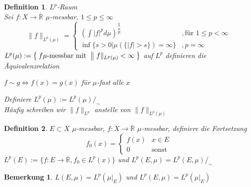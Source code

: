 \documentclass[11pt]{memoir}
\theoremstyle{changebreak}
\newtheorem{Definition}{Definition}[chapter]
\newtheorem{Bemerkung}{Bemerkung}[chapter]
\begin{document}

\begin{Definition}
\emph{$L^p$-Raum} \\
Sei $f: X \rightarrow \overline{\mathbb R}$ $\mu$-messbar, $1 \leq p \leq \infty$ \\
\begin{equation}
\|f\|_{L^p (\mu)} =
\begin{cases}
	\left( \int |f|^p d\mu\right) ^{\dfrac{1}{p}} & , \text{für } 1 \leq p < \infty \\
	\inf \{s > 0 | \mu(\{|f| > s\}) = \infty \} & , p = \infty
\end{cases}
\end{equation}
$L^p(\mu):= \Set{f \mu\text{-messbar mit }\|f\|_{L^p (\mu)} < \infty}$ auf $L^p$ definieren die Äquivalenzrelation
\begin{center}
	$f \sim g \Leftrightarrow f(x) = g(x)$ für $\mu$-fast alle $x$
\end{center}
Definiere $L^p(\mu) := L^p(\mu) /_\sim$ \\
Häufig schreiben wir $\|f\|_{L^p}$ anstelle von $\|f\|_{L^p (\mu)}$
\end{Definition}

\begin{Definition}
$E \subset X$ $\mu$-messbar, $f: X \rightarrow \overline{\mathbb R}$ $\mu$-messbar, definiere die Fortsetzung
\begin{equation}
f_0(x) =
\begin{cases}
	f(x) & x \in E \\
	0 & \text{sonst}
\end{cases}
\end{equation}
$L^p(E) := \{f: E \rightarrow \overline{\mathbb R}, f_0 \in L^p(x)\}$ und $L^p(E, \mu) = L^p(E, \mu)/_\sim$
\end{Definition}

\begin{Bemerkung}
$L(E, \mu) = L^p(\mu|_E)$ und $L^p(E, \mu) = L^p(\mu|_E)$
\end{Bemerkung}
\end{document}
